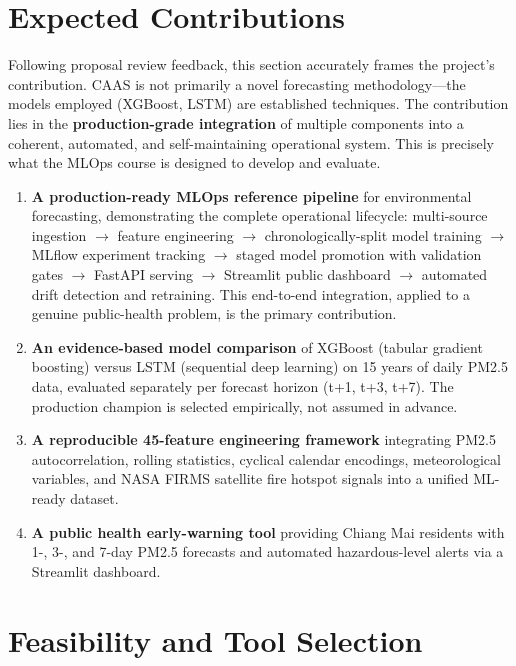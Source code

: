 \documentclass[12pt,a4paper]{report}
\begin{document}
\section{Expected Contributions}

Following proposal review feedback, this section accurately frames the project's contribution. CAAS is not primarily a novel forecasting methodology---the models employed (XGBoost, LSTM) are established techniques. The contribution lies in the \textbf{production-grade integration} of multiple components into a coherent, automated, and self-maintaining operational system. This is precisely what the MLOps course is designed to develop and evaluate.

\begin{enumerate}
  \item \textbf{A production-ready MLOps reference pipeline} for environmental forecasting, demonstrating the complete operational lifecycle: multi-source ingestion $\to$ feature engineering $\to$ chronologically-split model training $\to$ MLflow experiment tracking $\to$ staged model promotion with validation gates $\to$ FastAPI serving $\to$ Streamlit public dashboard $\to$ automated drift detection and retraining. This end-to-end integration, applied to a genuine public-health problem, is the primary contribution.

  \item \textbf{An evidence-based model comparison} of XGBoost (tabular gradient boosting) versus LSTM (sequential deep learning) on 15 years of daily PM2.5 data, evaluated separately per forecast horizon (t+1, t+3, t+7). The production champion is selected empirically, not assumed in advance.

  \item \textbf{A reproducible 45-feature engineering framework} integrating PM2.5 autocorrelation, rolling statistics, cyclical calendar encodings, meteorological variables, and NASA FIRMS satellite fire hotspot signals into a unified ML-ready dataset.

  \item \textbf{A public health early-warning tool} providing Chiang Mai residents with 1-, 3-, and 7-day PM2.5 forecasts and automated hazardous-level alerts via a Streamlit dashboard.
\end{enumerate}

\section{Feasibility and Tool Selection}
\end{document}
